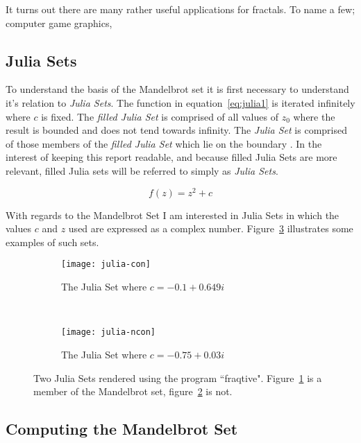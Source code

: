 It turns out there are many rather useful applications for fractals. To name a few; computer game graphics, %

\subsection*{Julia Sets}

To understand the basis of the Mandelbrot set it is first necessary to understand it's relation to \textit{Julia Sets}.
The function in equation~\ref{eq:julia1} is iterated infinitely where \(c\) is fixed.
The \textit{filled Julia Set} is comprised of all values of \(z_0\) where the result is bounded and does not tend towards infinity.
The \textit{Julia Set} is comprised of those members of the \textit{filled Julia Set} which lie on the boundary \cite{chaosfract}.
In the interest of keeping this report readable, and because filled Julia Sets are more relevant, filled Julia sets will be 
referred to simply as \textit{Julia Sets}.

\begin{equation}\label{eq:julia1}
f(z) = z^2 + c
\end{equation}

With regards to the Mandelbrot Set I am interested in Julia Sets in which the values \(c\) and \(z\) used are expressed as a complex number. 
Figure~\ref{fig:juliaimgs} illustrates some examples of such sets. 

\begin{figure}[h]
\centering
\begin{subfigure}[b]{0.48\textwidth}
  \centering    
  \texttt{[image: julia-con]}
  \caption{
    \tiny The Julia Set where \(c = -0.1 + 0.649i\)
  }
  \label{fig:juliaimgcon}
\end{subfigure}
~ %
\begin{subfigure}[b]{0.48\textwidth}
  \centering
  \texttt{[image: julia-ncon]}
  \caption{
    \tiny The Julia Set where \(c = -0.75 + 0.03i\)
  }
  \label{fig:juliaimgncon}
\end{subfigure}
\caption{
  Two Julia Sets rendered using the program ``fraqtive"\cite{fraqtive}. 
  Figure~\ref{fig:juliaimgcon} is a member of the Mandelbrot set, 
  figure~\ref{fig:juliaimgncon} is not.
}
\label{fig:juliaimgs}
\end{figure}

\subsection*{Computing the Mandelbrot Set}

